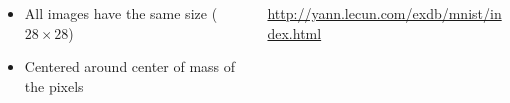 \begin{frame}
\begin{columns}
\begin{column}{0.5\textwidth}
\begin{itemize}
\begin{itemize}
        \item All images have the same size ($28 \times 28$)
        \item Centered around center of mass of the pixels
        \end{itemize}
      \end{itemize}
    \end{column}
    \begin{column}{0.5\textwidth}
      \url{http://yann.lecun.com/exdb/mnist/index.html}
    \end{column}
  \end{columns}
\end{frame}
